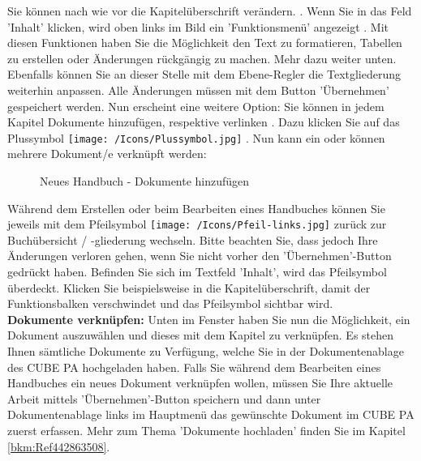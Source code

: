 Sie können nach wie vor die Kapitelüberschrift verändern. . Wenn Sie in das Feld 'Inhalt'  klicken, wird oben links im Bild ein 'Funktionsmenü' angezeigt . Mit diesen Funktionen haben Sie die Möglichkeit den Text zu formatieren, Tabellen zu erstellen oder Änderungen rückgängig zu machen. Mehr dazu weiter unten. Ebenfalls können Sie an dieser Stelle mit dem Ebene-Regler  die Textgliederung weiterhin anpassen. Alle Änderungen müssen mit dem Button 'Übernehmen'  gespeichert werden. Nun erscheint eine weitere Option: Sie können in jedem Kapitel Dokumente hinzufügen, respektive verlinken . Dazu klicken Sie auf das Plussymbol \texttt{[image: /Icons/Plussymbol.jpg]} . Nun kann ein oder können mehrere Dokument/e verknüpft werden:

\begin{figure}[H]
\caption{Neues Handbuch - Dokumente hinzufügen}
\end{figure}

Während dem Erstellen oder beim Bearbeiten eines Handbuches können Sie jeweils mit dem Pfeilsymbol \texttt{[image: /Icons/Pfeil-links.jpg]}  zurück zur Buchübersicht / -gliederung wechseln. Bitte beachten Sie, dass jedoch Ihre Änderungen verloren gehen, wenn Sie nicht vorher den 'Übernehmen'-Button gedrückt haben. Befinden Sie sich im Textfeld 'Inhalt', wird das Pfeilsymbol überdeckt. Klicken Sie beispielsweise in die Kapitelüberschrift, damit der Funktionsbalken verschwindet und das Pfeilsymbol sichtbar wird. \\

\textbf{Dokumente verknüpfen:} Unten im Fenster haben Sie nun die Möglichkeit, ein Dokument auszuwählen und dieses mit dem Kapitel zu verknüpfen. Es stehen Ihnen sämtliche Dokumente zu Verfügung, welche Sie in der Dokumentenablage des CUBE PA hochgeladen haben. Falls Sie während dem Bearbeiten eines Handbuches ein neues Dokument verknüpfen wollen, müssen Sie Ihre aktuelle Arbeit mittels 'Übernehmen'-Button speichern und dann unter Dokumentenablage links im Hauptmenü das gewünschte Dokument im CUBE PA zuerst erfassen. Mehr zum Thema 'Dokumente hochladen' finden Sie im Kapitel \ref{bkm:Ref442863508}. \\

